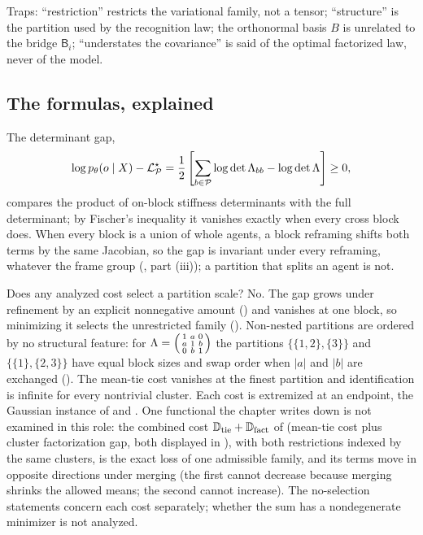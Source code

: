 Traps: ``restriction'' restricts the variational family, not a tensor; ``structure'' is the partition
used by the recognition law; the orthonormal basis \(B\) is unrelated to the bridge \(\mathsf B_i\);
``understates the covariance'' is said of the optimal factorized law, never of the model.

\subsection{The formulas, explained}

The determinant gap,
\[
\log p_\theta(o\mid X)-\mathcal L^\star_{\mathcal P}=\frac12\left[\sum_{b\in\mathcal P}\log\det\Lambda_{bb}-\log\det\Lambda\right]\geq0,
\]
compares the product of on-block stiffness determinants with the full determinant; by Fischer's
inequality it vanishes exactly when every cross block does. When every block is a union of whole agents,
a block reframing shifts both terms by the same Jacobian, so the gap is invariant under every reframing,
whatever the frame group (, part (iii)); a partition
that splits an agent is not.

Does any analyzed cost select a partition scale? No. The gap grows under refinement by an explicit
nonnegative amount () and vanishes at one block, so minimizing
it selects the unrestricted family (). Non-nested partitions are
ordered by no structural feature: for
\(\Lambda=\begin{psmallmatrix}1&a&0\\a&1&b\\0&b&1\end{psmallmatrix}\) the partitions
\(\{\{1,2\},\{3\}\}\) and \(\{\{1\},\{2,3\}\}\) have equal block sizes and swap order when \(|a|\) and
\(|b|\) are exchanged (). The mean-tie cost vanishes at the finest
partition and identification is infinite for every nontrivial cluster. Each cost is extremized at an
endpoint, the Gaussian instance of  and .
One functional the chapter writes down is not examined in this role: the combined cost
\(\mathbb D_{\rm tie}+\mathbb D_{\rm fact}\) of  (mean-tie cost plus
cluster factorization gap, both displayed in ), with both
restrictions indexed by the same clusters, is the exact loss of one admissible family, and its terms move
in opposite directions under merging (the first cannot decrease because merging shrinks the allowed
means; the second cannot increase). The no-selection statements concern each cost separately; whether
the sum has a nondegenerate minimizer is not analyzed.


